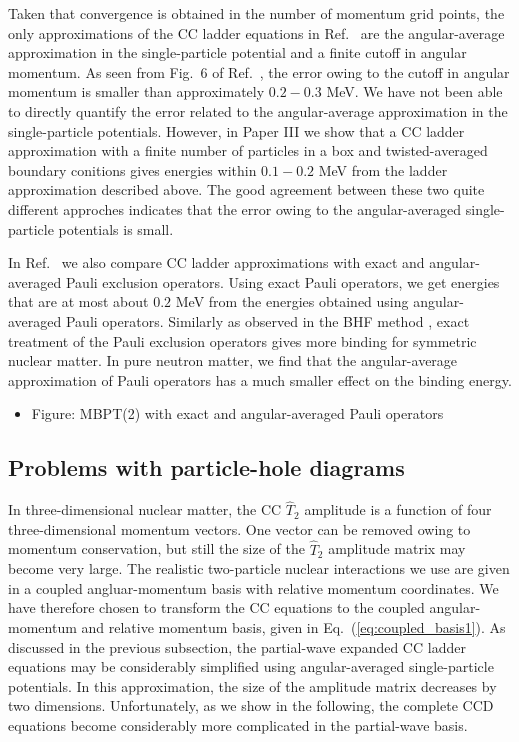 \documentclass[a4paper,12pt]{report}
\begin{document}
Taken that convergence is obtained in the number of momentum 
grid points, the only approximations of the CC ladder equations
in Ref.~\cite{baardsen} are the angular-average approximation in 
the single-particle potential and a finite cutoff in angular 
momentum. As seen from Fig.~6 of Ref.~\cite{baardsen}, the error 
owing to the cutoff in angular momentum is smaller than approximately 
$0.2-0.3$ MeV. We have not been able to directly quantify the error 
related to the 
angular-average approximation in the single-particle potentials. 
However, in Paper III we show that a CC ladder approximation with a finite 
number of particles in a box and twisted-averaged boundary conitions 
gives energies within $0.1-0.2$ MeV from the ladder approximation 
described above. The good agreement between these two quite different
approches indicates that the error owing to the angular-averaged
single-particle potentials is small.  
 
In Ref.~\cite{baardsen} we also compare CC ladder approximations with 
exact and angular-averaged Pauli exclusion operators. Using exact 
Pauli operators, we get energies that are at most about $0.2$ MeV
from the energies obtained using angular-averaged Pauli operators.
Similarly as observed in the BHF method \cite{suzuki,schiller},
exact treatment of the Pauli exclusion operators gives more
binding for symmetric nuclear matter. In pure neutron matter,
we find that the angular-average approximation of Pauli operators 
has a much smaller effect on the binding energy.

\begin{itemize}
\item Figure: MBPT(2) with exact and angular-averaged Pauli operators 
\end{itemize}


\subsection{Problems with particle-hole diagrams}
In three-dimensional nuclear matter, the CC $\hat{T}_{2}$ amplitude is a 
function of four three-dimensional momentum vectors. One vector can be 
removed owing to momentum conservation, but still the size of the 
$\hat{T}_{2}$ amplitude matrix may become very large. The realistic 
two-particle nuclear interactions we use are given in a coupled 
angluar-momentum basis with relative momentum coordinates. We have 
therefore chosen to transform the CC equations to the coupled 
angular-momentum and relative momentum basis, given in 
Eq.~(\ref{eq:coupled_basis1}). As discussed in the previous 
subsection, the partial-wave expanded CC ladder equations  
may be considerably simplified using angular-averaged single-particle 
potentials. In this approximation, the size of the amplitude matrix 
decreases by two dimensions. Unfortunately, as we show in the
following, the complete CCD equations become considerably more
complicated in the partial-wave basis.
\end{document}
